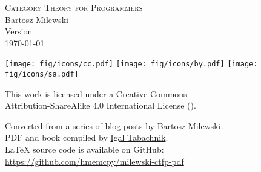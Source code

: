 

\vspace*{0.3\textheight}
\thispagestyle{empty}

\begin{small}
\begin{center}

\textsc{Category Theory for Programmers}\\

\vspace{1.0em}
\noindent
Bartosz Milewski\\

\vspace{1.26em}
\noindent
Version \texttt{\OPTversion}\\\today


\vspace{1.6em}
\noindent
\texttt{[image: fig/icons/cc.pdf]}
\texttt{[image: fig/icons/by.pdf]}
\texttt{[image: fig/icons/sa.pdf]}

\vspace{0.4em}
\noindent
This work is licensed under a Creative Commons\\
Attribution-ShareAlike 4.0 International License
(\href{http://creativecommons.org/licenses/by-sa/4.0/}{}).

\vspace{1.26em}
\noindent
Converted from a series of blog posts by \href{https://bartoszmilewski.com/2014/10/28/category-theory-for-programmers-the-preface/}{Bartosz Milewski}.\\
PDF and book compiled by \href{https://hmemcpy.com}{Igal Tabachnik}.\\
\vspace{1.26em}
\noindent
\LaTeX{} source code is available on GitHub: \href{https://github.com/hmemcpy/milewski-ctfp-pdf}{https://github.com/hmemcpy/milewski-ctfp-pdf} 
\end{center}
\end{small}